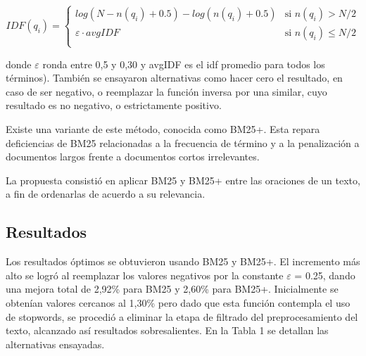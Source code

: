 \documentclass{llncs}
\begin{document}
\begin{equation}
 IDF(q_i) =
  \begin{cases}
       log(N - n(q_i) + 0.5) - log(n(q_i) + 0.5)    & \text{si }  n(q_i) > N/2\\
       \varepsilon \cdot avgIDF                     & \text{si }  n(q_i) \leq N/2\\
  \end{cases}
\end{equation}                
                
donde $\varepsilon$ ronda entre 0,5 y 0,30 y avgIDF es el idf promedio para todos los términos).
También se ensayaron alternativas como hacer cero el resultado, en caso de ser negativo, o reemplazar la función inversa por una similar, cuyo resultado es no negativo, o estrictamente positivo. 

Existe una variante de este método, conocida como BM25+. Esta repara deficiencias de BM25 relacionadas a la frecuencia de término y a la penalización a documentos largos frente a documentos cortos irrelevantes.

La propuesta consistió en aplicar BM25 y BM25+ entre las oraciones de un texto, a fin de ordenarlas de acuerdo a su relevancia.


\subsection{Resultados}
Los resultados óptimos se obtuvieron usando BM25 y BM25+. El incremento más alto se logró al reemplazar los valores negativos por la constante $\varepsilon$ = 0.25, dando una mejora total de 2,92\% para BM25 y 2,60\% para BM25+. Inicialmente se obtenían valores cercanos al 1,30\% pero dado que esta función contempla el uso de stopwords, se procedió a eliminar la etapa de filtrado del preprocesamiento del texto, alcanzado así resultados sobresalientes. En la Tabla 1 se detallan las alternativas ensayadas.
\end{document}
